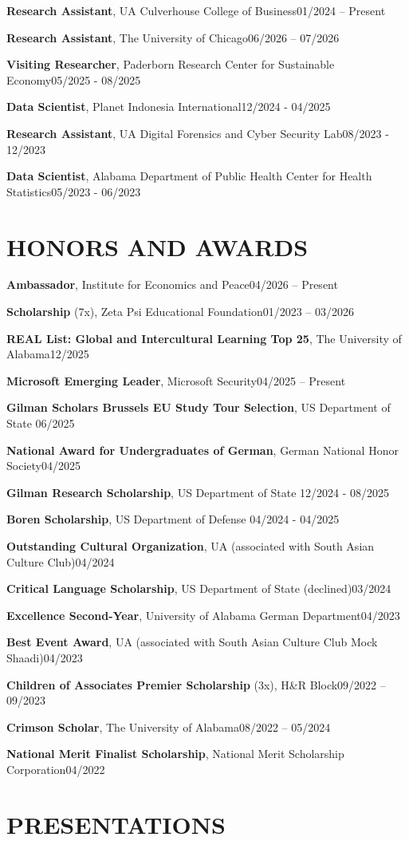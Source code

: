 \documentclass[a4paper,9pt]{extarticle}
\newcommand{\empitem}[2]{\noindent#1\hfill#2\par\vspace{2pt}}
\begin{document}
\empitem{\textbf{Research Assistant}, UA Culverhouse College of Business}{01/2024 -- Present}
\empitem{\textbf{Research Assistant}, The University of Chicago}{06/2026 -- 07/2026}
\empitem{\textbf{Visiting Researcher}, Paderborn Research Center for Sustainable Economy}{05/2025 - 08/2025}
\empitem{\textbf{Data Scientist}, Planet Indonesia International}{12/2024 - 04/2025}
\empitem{\textbf{Research Assistant}, UA Digital Forensics and Cyber Security Lab}{08/2023 - 12/2023}
\empitem{\textbf{Data Scientist}, Alabama Department of Public Health Center for Health Statistics}{05/2023 - 06/2023}

\section*{HONORS AND AWARDS}

\empitem{\textbf{Ambassador}, Institute for Economics and Peace}{04/2026 -- Present}
\empitem{\textbf{Scholarship} (7x), Zeta Psi Educational Foundation}{01/2023 -- 03/2026}
\empitem{\textbf{REAL List: Global and Intercultural Learning Top 25}, The University of Alabama}{12/2025}
\empitem{\textbf{Microsoft Emerging Leader}, Microsoft Security}{04/2025 -- Present}
\empitem{\textbf{Gilman Scholars Brussels EU Study Tour Selection}, US Department of State }{06/2025}
\empitem{\textbf{National Award for Undergraduates of German}, German National Honor Society}{04/2025}
\empitem{\textbf{Gilman Research Scholarship}, US Department of State }{12/2024 - 08/2025}
\empitem{\textbf{Boren Scholarship}, US Department of Defense }{04/2024 - 04/2025}
\empitem{\textbf{Outstanding Cultural Organization}, UA (associated with South Asian Culture Club)}{04/2024}
\empitem{\textbf{Critical Language Scholarship}, US Department of State (declined)}{03/2024}
\empitem{\textbf{Excellence Second-Year}, University of Alabama German Department}{04/2023}
\empitem{\textbf{Best Event Award}, UA (associated with South Asian Culture Club Mock Shaadi)}{04/2023}
\empitem{\textbf{Children of Associates Premier Scholarship} (3x), H\&R Block}{09/2022 -- 09/2023}
\empitem{\textbf{Crimson Scholar}, The University of Alabama}{08/2022 -- 05/2024}
\empitem{\textbf{National Merit Finalist Scholarship}, National Merit Scholarship Corporation}{04/2022}


\section*{PRESENTATIONS}
\end{document}
